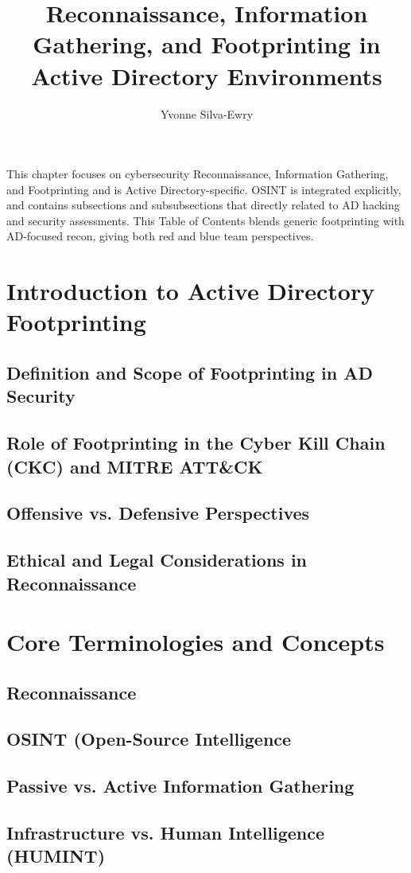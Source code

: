 \documentclass{article}
\title{Reconnaissance, Information Gathering, and Footprinting in Active Directory Environments}
\author{Yvonne Silva-Ewry}
\date{ }
\begin{document}
\maketitle
This chapter focuses on cybersecurity Reconnaissance, Information Gathering, and Footprinting and is Active Directory-specific. OSINT is integrated explicitly, and contains subsections and subsubsections that directly related to AD hacking and security assessments. This Table of Contents blends generic footprinting with AD-focused recon, giving both red and blue team perspectives.
     

\tableofcontents

\section{Introduction to Active Directory Footprinting}
\subsection{Definition and Scope of Footprinting in AD Security}
\subsection{Role of Footprinting in the Cyber Kill Chain (CKC) and MITRE ATT\&CK}
\subsection{Offensive vs. Defensive Perspectives}
\subsection{Ethical and Legal Considerations in Reconnaissance}
\section{Core Terminologies and Concepts}
\subsection{Reconnaissance}
\subsection{OSINT (Open-Source Intelligence}
\subsection{Passive vs. Active Information Gathering}
\subsection{Infrastructure vs. Human Intelligence (HUMINT)}
\end{document}

